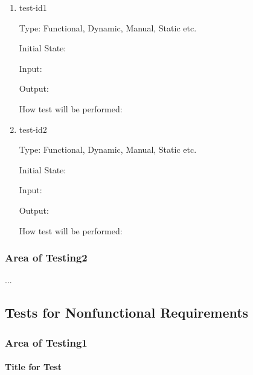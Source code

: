 \documentclass[12pt, titlepage]{article}
\begin{document}
\begin{enumerate}

\item{test-id1\\}

Type: Functional, Dynamic, Manual, Static etc.
                    
Initial State: 
                    
Input: 
                    
Output: 
                    
How test will be performed: 
                    
\item{test-id2\\}

Type: Functional, Dynamic, Manual, Static etc.
                    
Initial State: 
                    
Input: 
                    
Output: 
                    
How test will be performed: 

\end{enumerate}

\subsubsection{Area of Testing2}

...

\subsection{Tests for Nonfunctional Requirements}

\subsubsection{Area of Testing1}
        
\paragraph{Title for Test}
\end{document}
